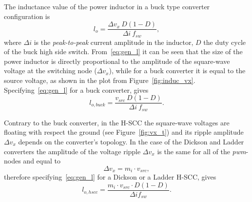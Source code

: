 The inductance value of the power inductor in a buck type converter configuration is
\begin{equation}
 l_{o}   = \frac{\Delta v_{x} ~ D (1-D)}{\Delta i ~ f_{sw}},
\label{eq:gen_l}
\end{equation}
where $\Delta i$ is the \emph{peak-to-peak} current amplitude in the inductor, $D$ the duty cycle of the buck high side switch. From~\eqref{eq:gen_l} it can be seen that the size of the power inductor is directly proportional to the amplitude of the square-wave voltage at the switching node ($\Delta v_x$), while for a buck converter it is equal to the source voltage, as shown in the plot from Figure~\ref{fig:induc_vx}. Specifying~\eqref{eq:gen_l} for a buck converter, gives
\begin{equation}
 l_{o,buck}  = \frac{v_{src} ~ D(1-D)}{\Delta i ~ f_{sw} }.
\label{eq:buck_l}
\end{equation}

Contrary to the buck converter, in the H-SCC the square-wave voltages are floating with respect the ground (see Figure~\ref{fig:vx_t}) and its ripple amplitude $\Delta v_x$ depends on the converter's topology. In the case of the Dickson and Ladder converters the amplitude of the voltage ripple $\Delta v_x$ is the same for all of the \emph{pwm}-nodes and equal to
\begin{equation}
 \Delta v_x   = m_i \cdot v_{src},
\label{eq:h_scc_Del_vx}
\end{equation}
therefore specifying~\eqref{eq:gen_l} for a Dickson or a Ladder H-SCC, gives
\begin{equation}
 l_{o,hscc}  = \frac{ m_i \cdot v_{src} \cdot D (1-D)}{\Delta i f_{sw} }.
\label{eq:hscc_l}
\end{equation}

